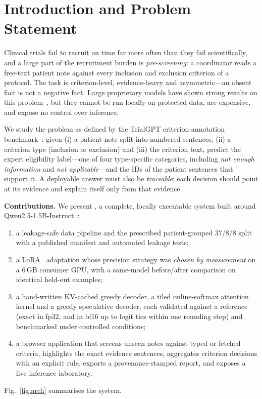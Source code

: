 \section{Introduction and Problem Statement}\label{sec:intro}
Clinical trials fail to recruit on time far more often than they fail scientifically, and a large part
of the recruitment burden is \emph{pre-screening}: a coordinator reads a free-text patient note against
every inclusion and exclusion criterion of a protocol. The task is criterion-level, evidence-heavy and
asymmetric---an absent fact is not a negative fact. Large proprietary models have shown strong results on
this problem~\cite{jin2024trialgpt,wornow2024zeroshot}, but they cannot be run locally on protected data,
are expensive, and expose no control over inference.

We study the problem as defined by the TrialGPT criterion-annotation benchmark~\cite{jin2024trialgpt}:
given (i) a patient note split into numbered sentences, (ii) a criterion type (inclusion or exclusion) and
(iii) the criterion text, predict the expert eligibility label---one of four type-specific categories,
including \emph{not enough information} and \emph{not applicable}---and the IDs of the patient sentences
that support it. A deployable answer must also be \emph{traceable}: each decision should point at its
evidence and explain itself only from that evidence.

\textbf{Contributions.} We present \sys, a complete, locally executable system built around
Qwen2.5-1.5B-Instruct~\cite{qwen2025qwen25}:
\begin{enumerate}
\item a leakage-safe data pipeline and the prescribed patient-grouped 37/8/8 split with a published
manifest and automated leakage tests;
\item a LoRA~\cite{hu2022lora} adaptation whose precision strategy was \emph{chosen by measurement} on a
6\,GB consumer GPU, with a same-model before/after comparison on identical held-out examples;
\item a hand-written KV-cached greedy decoder, a tiled online-softmax attention kernel and a greedy
speculative decoder, each validated against a reference (exact in fp32, and in bf16 up to logit ties within one rounding
step) and benchmarked under controlled conditions;
\item a browser application that screens unseen notes against typed or fetched criteria, highlights the
exact evidence sentences, aggregates criterion decisions with an explicit rule, exports a provenance-stamped
report, and exposes a live inference laboratory.
\end{enumerate}
Fig.~\ref{fig:arch} summarises the system.


